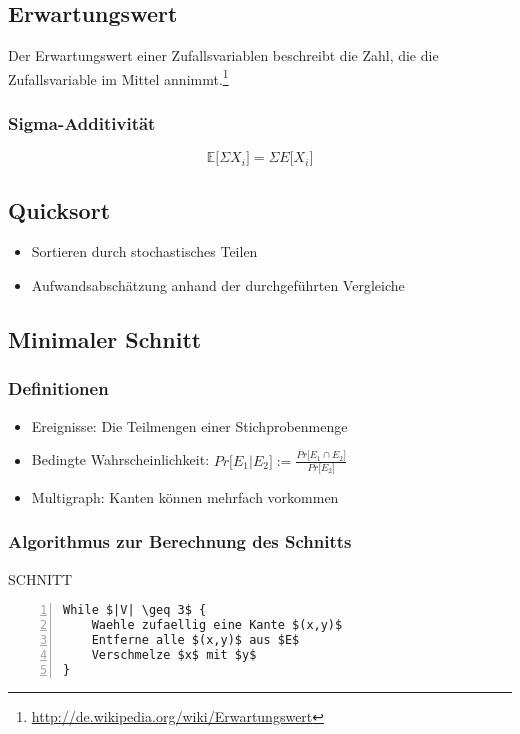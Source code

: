 \subsection{Erwartungswert}
Der Erwartungswert einer Zufallsvariablen beschreibt die Zahl, die die Zufallsvariable im Mittel annimmt.\footnote{\url{http://de.wikipedia.org/wiki/Erwartungswert}}

\subsubsection{Sigma-Additivität}
\[\mathbb{E}\lbrack \Sigma X_i\rbrack = \Sigma E \lbrack X_i\rbrack\]


\subsection{Quicksort}
\begin{itemize}
	\item Sortieren durch stochastisches Teilen
	\item Aufwandsabschätzung anhand der durchgeführten Vergleiche
\end{itemize}


\subsection{Minimaler Schnitt}

\subsubsection{Definitionen}
\begin{itemize}
	\item Ereignisse: Die Teilmengen einer Stichprobenmenge
	\item Bedingte Wahrscheinlichkeit: \(Pr \lbrack E_1 | E_2 \rbrack := \frac{Pr\lbrack E_1 \cap E_2 \rbrack}{Pr\lbrack E_2 \rbrack} \)
	\item Multigraph: Kanten können mehrfach vorkommen
\end{itemize}

\subsubsection{Algorithmus zur Berechnung des Schnitts}
\begin{minipage}{\textwidth}
SCHNITT
\begin{lstlisting}[frame=single,numbers=left,mathescape]
While $|V| \geq 3$ {
	Waehle zufaellig eine Kante $(x,y)$
	Entferne alle $(x,y)$ aus $E$
	Verschmelze $x$ mit $y$
}
\end{lstlisting}
\end{minipage}



